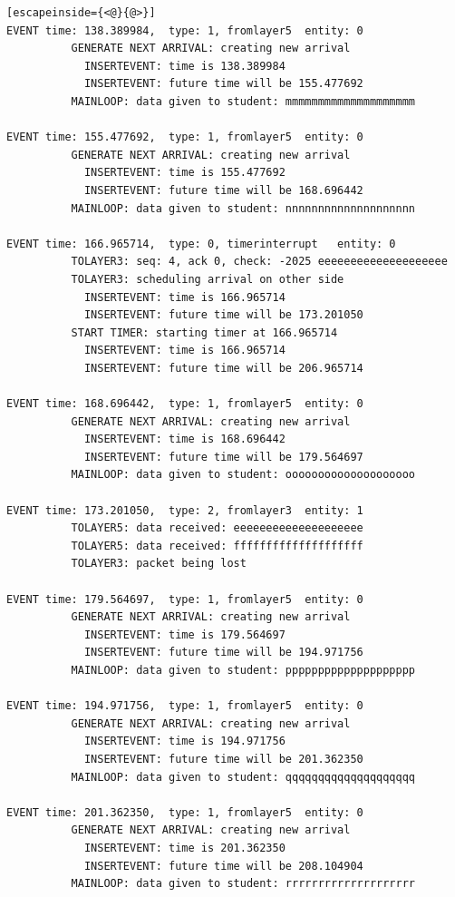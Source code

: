 \documentclass[paper=a4, fontsize=11pt]{scrartcl}
\numberwithin{equation}{section}		%
\numberwithin{figure}{section}			%
\numberwithin{table}{section}				%
\begin{document}
\begin{lstlisting}[escapeinside={<@}{@>}]
EVENT time: 138.389984,  type: 1, fromlayer5  entity: 0
          GENERATE NEXT ARRIVAL: creating new arrival
            INSERTEVENT: time is 138.389984
            INSERTEVENT: future time will be 155.477692
          MAINLOOP: data given to student: mmmmmmmmmmmmmmmmmmmm

EVENT time: 155.477692,  type: 1, fromlayer5  entity: 0
          GENERATE NEXT ARRIVAL: creating new arrival
            INSERTEVENT: time is 155.477692
            INSERTEVENT: future time will be 168.696442
          MAINLOOP: data given to student: nnnnnnnnnnnnnnnnnnnn

EVENT time: 166.965714,  type: 0, timerinterrupt   entity: 0
          TOLAYER3: seq: 4, ack 0, check: -2025 eeeeeeeeeeeeeeeeeeee
          TOLAYER3: scheduling arrival on other side
            INSERTEVENT: time is 166.965714
            INSERTEVENT: future time will be 173.201050
          START TIMER: starting timer at 166.965714
            INSERTEVENT: time is 166.965714
            INSERTEVENT: future time will be 206.965714

EVENT time: 168.696442,  type: 1, fromlayer5  entity: 0
          GENERATE NEXT ARRIVAL: creating new arrival
            INSERTEVENT: time is 168.696442
            INSERTEVENT: future time will be 179.564697
          MAINLOOP: data given to student: oooooooooooooooooooo

EVENT time: 173.201050,  type: 2, fromlayer3  entity: 1
          TOLAYER5: data received: eeeeeeeeeeeeeeeeeeee
          TOLAYER5: data received: ffffffffffffffffffff
          TOLAYER3: packet being lost

EVENT time: 179.564697,  type: 1, fromlayer5  entity: 0
          GENERATE NEXT ARRIVAL: creating new arrival
            INSERTEVENT: time is 179.564697
            INSERTEVENT: future time will be 194.971756
          MAINLOOP: data given to student: pppppppppppppppppppp

EVENT time: 194.971756,  type: 1, fromlayer5  entity: 0
          GENERATE NEXT ARRIVAL: creating new arrival
            INSERTEVENT: time is 194.971756
            INSERTEVENT: future time will be 201.362350
          MAINLOOP: data given to student: qqqqqqqqqqqqqqqqqqqq

EVENT time: 201.362350,  type: 1, fromlayer5  entity: 0
          GENERATE NEXT ARRIVAL: creating new arrival
            INSERTEVENT: time is 201.362350
            INSERTEVENT: future time will be 208.104904
          MAINLOOP: data given to student: rrrrrrrrrrrrrrrrrrrr


\end{lstlisting}
\end{document}
